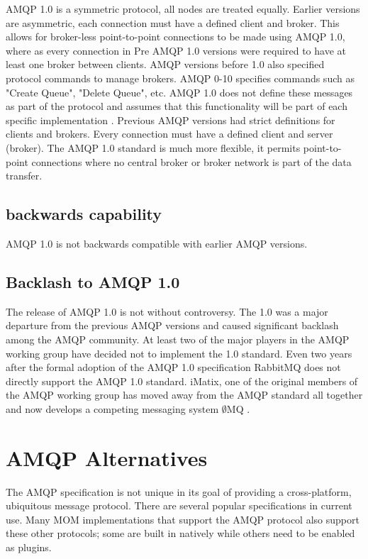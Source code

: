 \documentclass{thesis}
\begin{document}
AMQP 1.0 is a symmetric protocol, all nodes are treated equally.  Earlier versions are asymmetric, each connection must have a defined client and broker.  This allows for broker-less point-to-point connections to be made using AMQP 1.0, where as every connection in Pre AMQP 1.0 versions were required to have at least one broker between clients.  AMQP versions before 1.0 also specified protocol commands to manage brokers.  AMQP 0-10 specifies commands such as "Create Queue", "Delete Queue", etc.  AMQP 1.0 does not define these messages as part of the protocol and assumes that this functionality will be part of each specific implementation \cite{REDHAT1}.  Previous AMQP versions had strict definitions for clients and brokers.  Every connection must have a defined client and server (broker).  The AMQP 1.0 standard is much more flexible, it permits point-to-point connections where no central broker or broker network is part of the data transfer.  

\subsection{backwards capability}

AMQP 1.0 is not backwards compatible with earlier AMQP versions.  

\subsection{Backlash to AMQP 1.0}

The release of AMQP 1.0 is not without controversy.  The 1.0 was a major departure from the previous AMQP versions and caused significant backlash among the AMQP community.  At least two of the major players in the AMQP working group have decided not to implement the 1.0 standard.  Even two years after the formal adoption of the AMQP 1.0 specification RabbitMQ does not directly support the AMQP 1.0 standard.  iMatix, one of the original members of the AMQP working group has moved away from the AMQP standard all together and now develops a competing messaging system $\emptyset$MQ \cite{ZERO_MQ}. 

\section{AMQP Alternatives}
The AMQP specification is not unique in its goal of providing a cross-platform, ubiquitous message protocol.  There are several popular specifications in current use.  Many MOM implementations that support the AMQP protocol also support these other protocols; some are built in natively while others need to be enabled as plugins.   
\end{document}
